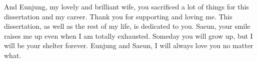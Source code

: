 And Eunjung, my lovely and brilliant wife, you sacrificed a lot of things for this dissertation and
my career.  Thank you for supporting and loving me.  This dissertation, as well as the rest of my
life, is dedicated to you.  Saeun, your smile raises me up even when I am totally exhausted.
Someday you will grow up, but I will be your shelter forever.  Eunjung and Saeun, I will always love
you no matter what.



